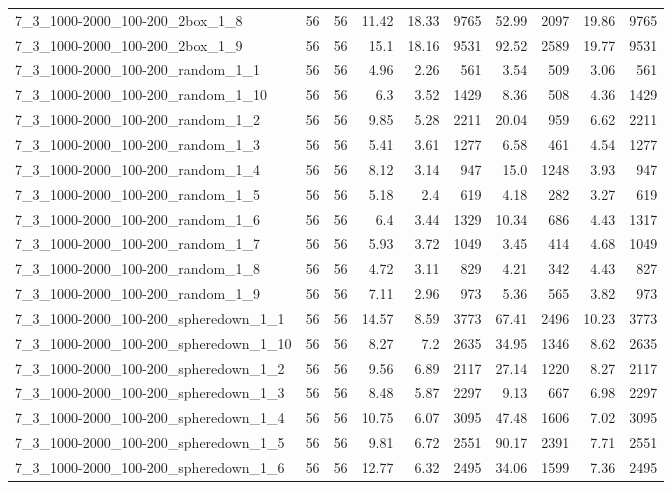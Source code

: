 \begin{center}
\begin{scriptsize}
\begin{longtable}{lrrrrrrrrr}
7\_3\_1000-2000\_100-200\_2box\_1\_8 & 56 & 56 & 11.42 & 18.33 & 9765 & 52.99 & 2097 & 19.86 & 9765\\
7\_3\_1000-2000\_100-200\_2box\_1\_9 & 56 & 56 & 15.1 & 18.16 & 9531 & 92.52 & 2589 & 19.77 & 9531\\
7\_3\_1000-2000\_100-200\_random\_1\_1 & 56 & 56 & 4.96 & 2.26 & 561 & 3.54 & 509 & 3.06 & 561\\
7\_3\_1000-2000\_100-200\_random\_1\_10 & 56 & 56 & 6.3 & 3.52 & 1429 & 8.36 & 508 & 4.36 & 1429\\
7\_3\_1000-2000\_100-200\_random\_1\_2 & 56 & 56 & 9.85 & 5.28 & 2211 & 20.04 & 959 & 6.62 & 2211\\
7\_3\_1000-2000\_100-200\_random\_1\_3 & 56 & 56 & 5.41 & 3.61 & 1277 & 6.58 & 461 & 4.54 & 1277\\
7\_3\_1000-2000\_100-200\_random\_1\_4 & 56 & 56 & 8.12 & 3.14 & 947 & 15.0 & 1248 & 3.93 & 947\\
7\_3\_1000-2000\_100-200\_random\_1\_5 & 56 & 56 & 5.18 & 2.4 & 619 & 4.18 & 282 & 3.27 & 619\\
7\_3\_1000-2000\_100-200\_random\_1\_6 & 56 & 56 & 6.4 & 3.44 & 1329 & 10.34 & 686 & 4.43 & 1317\\
7\_3\_1000-2000\_100-200\_random\_1\_7 & 56 & 56 & 5.93 & 3.72 & 1049 & 3.45 & 414 & 4.68 & 1049\\
7\_3\_1000-2000\_100-200\_random\_1\_8 & 56 & 56 & 4.72 & 3.11 & 829 & 4.21 & 342 & 4.43 & 827\\
7\_3\_1000-2000\_100-200\_random\_1\_9 & 56 & 56 & 7.11 & 2.96 & 973 & 5.36 & 565 & 3.82 & 973\\
7\_3\_1000-2000\_100-200\_spheredown\_1\_1 & 56 & 56 & 14.57 & 8.59 & 3773 & 67.41 & 2496 & 10.23 & 3773\\
7\_3\_1000-2000\_100-200\_spheredown\_1\_10 & 56 & 56 & 8.27 & 7.2 & 2635 & 34.95 & 1346 & 8.62 & 2635\\
7\_3\_1000-2000\_100-200\_spheredown\_1\_2 & 56 & 56 & 9.56 & 6.89 & 2117 & 27.14 & 1220 & 8.27 & 2117\\
7\_3\_1000-2000\_100-200\_spheredown\_1\_3 & 56 & 56 & 8.48 & 5.87 & 2297 & 9.13 & 667 & 6.98 & 2297\\
7\_3\_1000-2000\_100-200\_spheredown\_1\_4 & 56 & 56 & 10.75 & 6.07 & 3095 & 47.48 & 1606 & 7.02 & 3095\\
7\_3\_1000-2000\_100-200\_spheredown\_1\_5 & 56 & 56 & 9.81 & 6.72 & 2551 & 90.17 & 2391 & 7.71 & 2551\\
7\_3\_1000-2000\_100-200\_spheredown\_1\_6 & 56 & 56 & 12.77 & 6.32 & 2495 & 34.06 & 1599 & 7.36 & 2495\\

\end{longtable}
\end{scriptsize}
\end{center}
